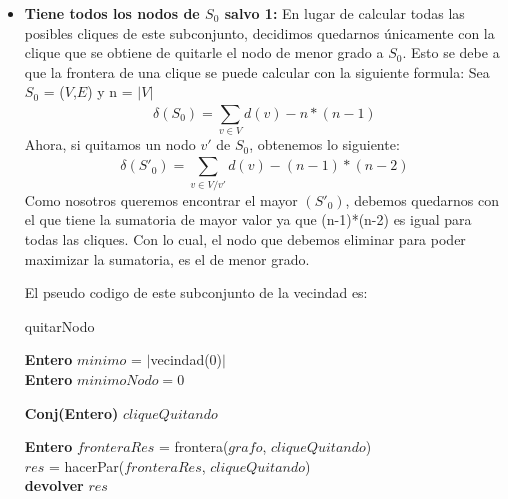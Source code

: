 \begin{itemize}
\item \textbf{Tiene todos los nodos de $S_{0}$ salvo 1:} \newline En lugar de calcular todas las posibles cliques de este subconjunto, decidimos quedarnos únicamente con la clique que se obtiene de quitarle el nodo de menor grado a $S_{0}$. Esto se debe a que la frontera de una clique se puede calcular con la siguiente formula:\newline
Sea $S_{0}$ = ($V$,$E$) y n = $|$$V$$|$
\begin{equation}
  \delta(S_{0}) = \sum_{v \in V}^{} d(v) - n*(n-1)
\end{equation}
Ahora, si quitamos un nodo $v'$ de $S_{0}$, obtenemos lo siguiente:
\begin{equation}
  \delta(S'_{0}) = \sum_{v \in V/v'}^{} d(v) - (n-1)*(n-2)
\end{equation}
Como nosotros queremos encontrar el mayor \delta$(S'_{0})$, debemos quedarnos con el que tiene la sumatoria de mayor valor ya que (n-1)*(n-2) es igual para todas las cliques. Con lo cual, el nodo que debemos eliminar para poder maximizar la sumatoria, es el de menor grado.

El pseudo codigo de este subconjunto de la vecindad es:\newline
\begin{algorithm}[H]
    \SetAlgoLined
    \caption{quitarNodo}
	
    \textbf{Entero} $minimo$ = $|$vecindad(0)$|$ \\	
    \textbf{Entero} $minimoNodo = 0$ \\
    
    \textbf{Conj(Entero)} $cliqueQuitando$\\

    
    \textbf{Entero} $fronteraRes$ = frontera($grafo$, $cliqueQuitando$)\\
    $res$ = hacerPar($fronteraRes$, $cliqueQuitando$)\\
    \textbf{devolver} $res$ \\
\end{algorithm}


\end{itemize}
